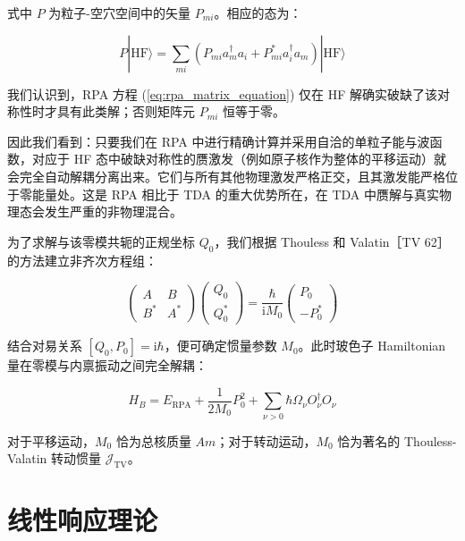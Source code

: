 式中 $P$ 为粒子-空穴空间中的矢量 $P_{mi}$。相应的态为：

\begin{equation}
P|\text{HF}\rangle=\sum_{mi}\left(P_{mi}a^{\dagger}_{m}a_{i}+P^{*}_{mi}a^{\dagger}_{i}a_{m}\right)|\text{HF}\rangle\label{eq:rpa_spurious_state_vector}
\end{equation}

我们认识到，RPA 方程 (\ref{eq:rpa_matrix_equation}) 仅在 HF 解确实破缺了该对称性时才具有此类解；否则矩阵元
$P_{mi}$ 恒等于零。

因此我们看到：只要我们在 RPA 中进行精确计算并采用自洽的单粒子能与波函数，对应于 HF 态中破缺对称性的赝激发（例如原子核作为整体的平移运动）就会完全自动解耦分离出来。它们与所有其他物理激发严格正交，且其激发能严格位于零能量处。这是
RPA 相比于 TDA 的重大优势所在，在 TDA 中赝解与真实物理态会发生严重的非物理混合。

为了求解与该零模共轭的正规坐标 $Q_{0}$，我们根据 Thouless 和 Valatin［TV 62］的方法建立非齐次方程组：

\begin{equation}
\begin{pmatrix}A & B\\
B^{*} & A^{*}
\end{pmatrix}\begin{pmatrix}Q_{0}\\
Q^{*}_{0}
\end{pmatrix}=\frac{\hbar}{\mathrm{i}M_{0}}\begin{pmatrix}P_{0}\\
-P^{*}_{0}
\end{pmatrix}\label{eq:rpa_thouless_valatin_eq}
\end{equation}

结合对易关系 $[Q_{0},P_{0}]=\mathrm{i}\hbar$，便可确定惯量参数 $M_{0}$。此时玻色子 Hamiltonian
量在零模与内禀振动之间完全解耦：

\begin{equation}
H_{B}=E_{\text{RPA}}+\frac{1}{2M_{0}}P^{2}_{0}+\sum_{\nu>0}\hbar\Omega_{\nu}O^{\dagger}_{\nu}O_{\nu}\label{eq:rpa_hamiltonian_with_zero_mode}
\end{equation}

对于平移运动，$M_{0}$ 恰为总核质量 $Am$；对于转动运动，$M_{0}$ 恰为著名的 Thouless-Valatin
转动惯量 $\mathcal{J}_{\text{TV}}$。

\section{线性响应理论\label{sec:8.5_=007EBF=006027=0054CD=005E94=007406=008BBA}}

